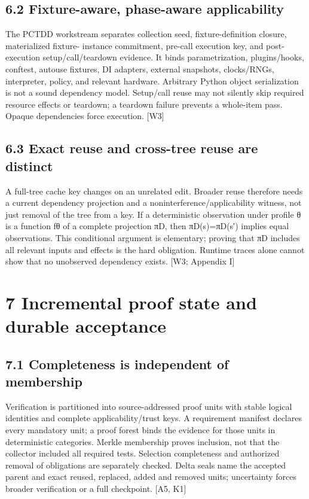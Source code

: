 \subsection*{6.2 Fixture-aware, phase-aware applicability}

The PCTDD workstream separates collection seed, fixture-definition closure, materialized fixture-
instance commitment, pre-call execution key, and post-execution setup/call/teardown evidence. It
binds parametrization, plugins/hooks, conftest, autouse fixtures, DI adapters, external snapshots,
clocks/RNGs, interpreter, policy, and relevant hardware. Arbitrary Python object serialization is
not a sound dependency model. Setup/call reuse may not silently skip required resource effects or
teardown; a teardown failure prevents a whole-item pass. Opaque dependencies force execution.
[W3]

\subsection*{6.3 Exact reuse and cross-tree reuse are distinct}

A full-tree cache key changes on an unrelated edit. Broader reuse therefore needs a current dependency
projection and a noninterference/applicability witness, not just removal of the tree from a key. If
a deterministic observation under profile θ is a function fθ of a complete projection πD, then
πD(s)=πD(s′) implies equal observations. This conditional argument is elementary; proving that πD
includes all relevant inputs and effects is the hard obligation. Runtime traces alone cannot show that
no unobserved dependency exists. [W3; Appendix I]

\section*{7 Incremental proof state and durable acceptance}
\subsection*{7.1 Completeness is independent of membership}

Verification is partitioned into source-addressed proof units with stable logical identities and complete
applicability/trust keys. A requirement manifest declares every mandatory unit; a proof forest binds
the evidence for those units in deterministic categories. Merkle membership proves inclusion, not
that the collector included all required tests. Selection completeness and authorized removal of
obligations are separately checked. Delta seals name the accepted parent and exact reused, replaced,
added and removed units; uncertainty forces broader verification or a full checkpoint. [A5, K1]

